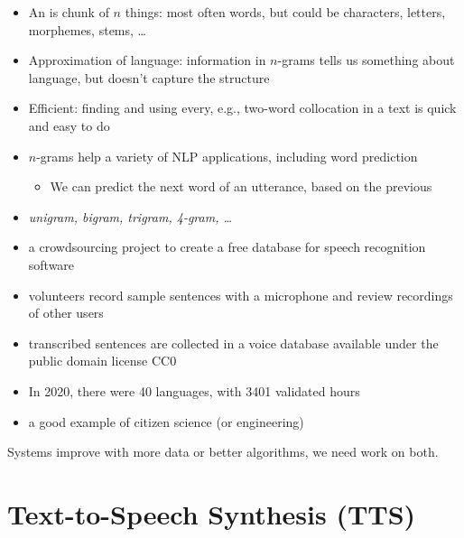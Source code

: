 \documentclass[a4paper,landscape,headrule,footrule,xetex]{foils}
\begin{document}
\begin{itemize}
\item An  is chunk of $n$ things: most often words, but could
  be characters, letters, morphemes, stems, \ldots
 \item Approximation of language: information in $n$-grams tells us something about language, but doesn't capture the structure
 \item Efficient: finding and using every, e.g., two-word collocation in a text is quick and easy to do
 \item $n$-grams help a variety of NLP applications, including word prediction
   \begin{itemize}
   \item We can predict the next word of an utterance, based on the previous 
   \end{itemize}
 \item \textit{unigram, bigram, trigram, 4-gram, \ldots}
\end{itemize}

\begin{itemize}
\item a crowdsourcing project to create a free database for speech
  recognition software
\item volunteers record sample sentences with a microphone and review
  recordings of other users
\item transcribed sentences are collected in a voice database
  available under the public domain license CC0
\item In 2020, there were 40 languages, with 3401 validated hours
\item a good example of citizen science (or engineering)
\end{itemize}

Systems improve with more data or better algorithms, we need work on both.

\section{Text-to-Speech Synthesis (TTS)}
\end{document}
